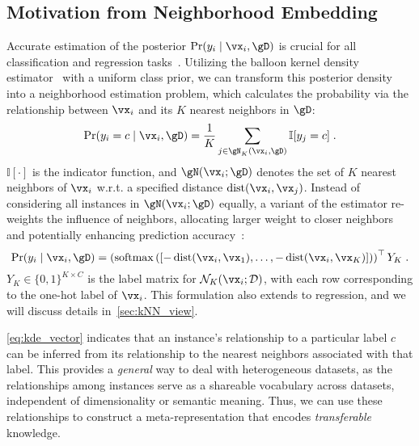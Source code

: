 \subsection{Motivation from Neighborhood Embedding}\label{sec:motivation}
Accurate estimation of the posterior $\Pr(y_i \mid \vx_i, \gD)$ is crucial for all classification and regression tasks~\citep{murphy2022probabilistic}. Utilizing the balloon kernel density estimator~\citep{terrell1992variable} with a uniform class prior, we can transform this posterior density into a neighborhood estimation problem, which calculates the probability via the relationship between $\vx_i$ and its $K$ nearest neighbors in $\gD$: 
\begin{equation}
    \Pr(y_i=c \mid \vx_i, \gD) = \frac{1}{K} \sum_{j\in \gN_K(\vx_i, \gD)} \mathbb{I}[y_j = c]\;.\label{eq:kde_estimator}
\end{equation}
$\mathbb{I}[\cdot]$ is the indicator function, and $\gN(\vx_i; \gD)$ denotes the set of $K$ nearest neighbors of $\vx_i$ w.r.t. a specified distance $\operatorname{dist}(\vx_i, \vx_j)$.
Instead of considering all instances in $\gN(\vx_i; \gD)$ equally, a variant of the estimator re-weights the influence of neighbors, allocating larger weight to closer neighbors and potentially enhancing prediction accuracy~\citep{bishop2006pattern,RasmussenW06}:
\begin{equation}
    \Pr(y_i \mid \vx_i, \gD) = \left(\operatorname{softmax}\left(\left[-\operatorname{dist}(\vx_i, \vx_1),\ldots,-\operatorname{dist}(\vx_i, \vx_{K})\right]\right)\right)^\top Y_K\;.
    \label{eq:kde_vector}
\end{equation}
$Y_K\in\{0,1\}^{K\times C}$ is the label matrix for $\mathcal{N}_K(\vx_i;\mathcal{D})$, with each row corresponding to the one-hot label of $\vx_i$. This formulation also extends to regression, and we will discuss details in~\autoref{sec:kNN_view}.

\autoref{eq:kde_vector} indicates that an instance's relationship to a particular label $c$ can be inferred from its relationship to the nearest neighbors associated with that label. 
This provides a {\em general} way to deal with heterogeneous datasets, as the relationships among instances serve as a shareable vocabulary across datasets, independent of dimensionality or semantic meaning. Thus, we can use these relationships to construct a meta-representation that encodes {\em transferable} knowledge.

